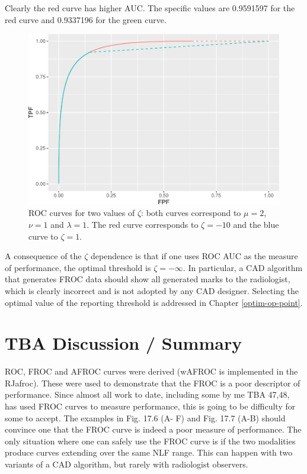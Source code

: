 \documentclass[
]{book}
\begin{document}
Clearly the red curve has higher AUC. The specific values are 0.9591597 for the red curve and 0.9337196 for the green curve.

\begin{figure}
\centering
\includegraphics{07-rsm-predictions_files/figure-latex/rsm-predictions-roc-zeta1-1.pdf}
\caption{\label{fig:rsm-predictions-roc-zeta1}ROC curves for two values of \(\zeta\): both curves correspond to \(\mu = 2\), \(\nu = 1\) and \(\lambda = 1\). The red curve corresponds to \(\zeta = -10\) and the blue curve to \(\zeta = 1\).}
\end{figure}

A consequence of the \(\zeta\) dependence is that if one uses ROC AUC as the measure of performance, the optimal threshold is \(\zeta = -\infty\). In particular, a CAD algorithm that generates FROC data should show all generated marks to the radiologist, which is clearly incorrect and is not adopted by any CAD designer. Selecting the optimal value of the reporting threshold is addressed in Chapter \ref{optim-op-point}.

\hypertarget{rsm-predictions-discussion-summary}{%
\section{TBA Discussion / Summary}\label{rsm-predictions-discussion-summary}}

ROC, FROC and AFROC curves were derived (wAFROC is implemented in the RJafroc). These were used to demonstrate that the FROC is a poor descriptor of performance. Since almost all work to date, including some by me TBA 47,48, has used FROC curves to measure performance, this is going to be difficulty for some to accept. The examples in Fig. 17.6 (A- F) and Fig. 17.7 (A-B) should convince one that the FROC curve is indeed a poor measure of performance. The only situation where one can safely use the FROC curve is if the two modalities produce curves extending over the same NLF range. This can happen with two variants of a CAD algorithm, but rarely with radiologist observers.
\end{document}
